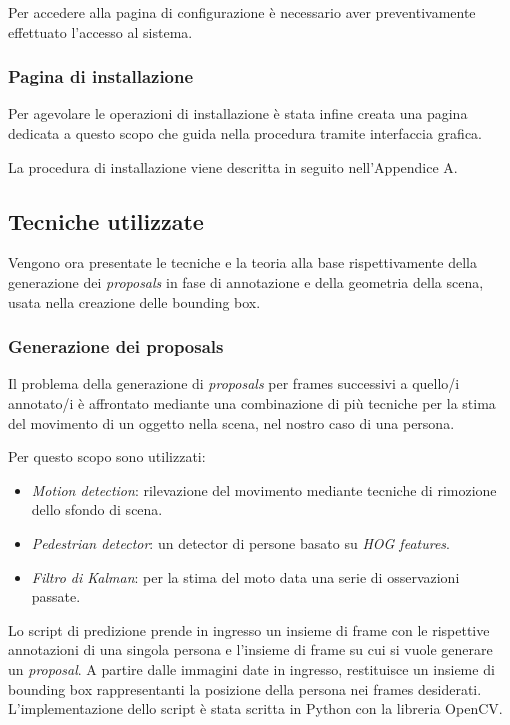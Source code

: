 Per accedere alla pagina di configurazione è necessario aver preventivamente effettuato l'accesso al sistema.

\subsubsection{Pagina di installazione}

Per agevolare le operazioni di installazione è stata infine creata una pagina dedicata a questo scopo che guida nella procedura tramite interfaccia grafica. 

La procedura di installazione viene descritta in seguito nell'Appendice A.

\subsection{Tecniche utilizzate}

Vengono ora presentate le tecniche e la teoria alla base rispettivamente della generazione dei \emph{proposals} in fase di annotazione e della geometria della scena, usata nella creazione delle bounding box.

\subsubsection{Generazione dei proposals}

Il problema della generazione di \emph{proposals} per frames successivi a quello/i annotato/i è affrontato mediante una combinazione di più tecniche per la stima del movimento di un oggetto nella scena, nel nostro caso di una persona.

Per questo scopo sono utilizzati:
\begin{itemize}
\item \emph{Motion detection}: rilevazione del movimento mediante tecniche di rimozione dello sfondo di scena.
\item \emph{Pedestrian detector}: un detector di persone basato su \emph{HOG features}.
\item \emph{Filtro di Kalman}: per la stima del moto data una serie di osservazioni passate.
\end{itemize}

Lo script di predizione prende in ingresso un insieme di frame con le rispettive annotazioni di una singola persona e l'insieme di frame su cui si vuole generare un \emph{proposal}. A partire dalle immagini date in ingresso, restituisce un insieme di bounding box rappresentanti la posizione della persona nei frames desiderati. L'implementazione dello script è stata scritta in Python con la libreria OpenCV.

